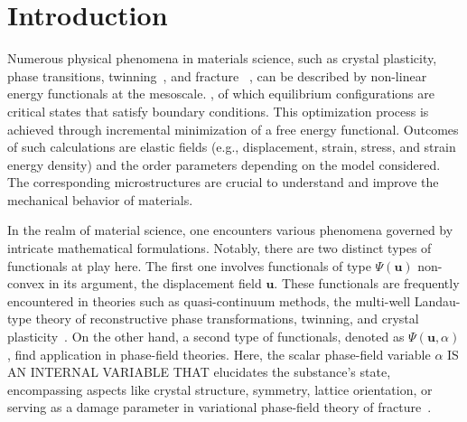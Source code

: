 \section{Introduction}
Numerous physical phenomena in materials science, such as crystal plasticity, phase transitions, twinning~\cite{Clayton2011-xq}, and fracture ~\cite{Baldelli2014-ho,Baldelli2021-gc}, can be described by non-linear energy functionals at the mesoscale. , of which equilibrium configurations are critical states that satisfy boundary conditions. This optimization process is achieved through incremental minimization of a free energy functional. Outcomes of such calculations are elastic fields
(e.g., displacement, strain, stress, and strain energy density) and the order parameters depending on the model considered. The corresponding microstructures are crucial to understand and improve the mechanical behavior of materials.

In the realm of material science, one encounters various phenomena governed by intricate mathematical formulations. Notably, there are two distinct types of functionals at play here. The first one involves functionals of type $\Psi(\mathbf u)$ non-convex in its argument, the displacement field $\mathbf u$. These functionals are frequently encountered in theories such as quasi-continuum methods, the multi-well Landau-type theory of reconstructive phase transformations, twinning, and crystal plasticity~\cite{Tadmor1996-qi,Conti2004-yj,Clayton2011-xq,Baggio2019-rs,Baggio2023-qu}. On the other hand, a second type of functionals, denoted as $\Psi(\mathbf u, \alpha)$, find application in phase-field theories. Here, the scalar phase-field variable $\alpha$ IS AN INTERNAL VARIABLE THAT elucidates the substance's state, encompassing aspects like crystal structure, symmetry, lattice orientation, \cite{Finel2010-zw,Ruffini2015-pn,Javanbakht2016-dr} or serving as a damage parameter in variational phase-field theory of fracture~\cite{francfort_marigo1998,Salman2021-mn}. 

